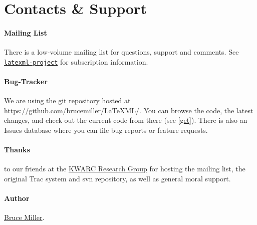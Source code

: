 \documentclass{article}
\begin{document}
\section{Contacts \& Support}\label{contact}

\paragraph{Mailing List}\label{contact.list}
There is a low-volume mailing list for questions, support and comments.
See \href{http://lists.informatik.uni-erlangen.de/mailman/listinfo/latexml}{\texttt{latexml-project}} for subscription information.

\paragraph{Bug-Tracker}\label{contact.git}
We are using the git repository hosted at
\href{https://github.com/brucemiller/LaTeXML/}{https://github.com/brucemiller/LaTeXML/}.
You can browse the code, the latest changes, and check-out the current code from
there (see \ref{get}).  There is also an Issues database where you can
file bug reports or feature requests.



\paragraph{Thanks} to our friends at
the \href{http://kwarc.info}{KWARC Research Group}
for hosting the mailing list, the original Trac system and svn repository,
as well as general moral support.

\paragraph{Author} \href{mailto:bruce.miller@nist.gov}{Bruce Miller}.
\end{document}
